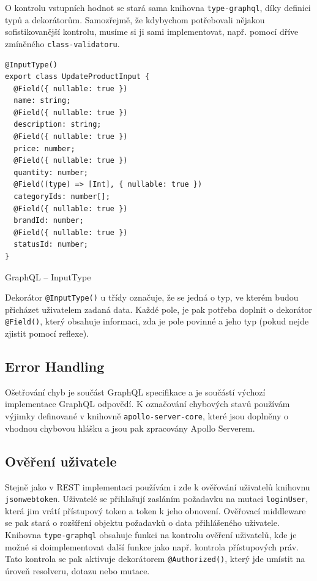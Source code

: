 \documentclass[thesis=M,czech]{FITthesis}[2019/12/23]
\begin{document}
O kontrolu vstupních hodnot se stará sama knihovna \texttt{type-graphql}, díky definici typů a dekorátorům. Samozřejmě, že kdybychom potřebovali nějakou sofistikovanější kontrolu, musíme si ji sami implementovat, např. pomocí dříve zmíněného \texttt{class-validatoru}. 

\begin{listing}[H]
\begin{verbatim}
@InputType()
export class UpdateProductInput {
  @Field({ nullable: true })
  name: string;
  @Field({ nullable: true })
  description: string;
  @Field({ nullable: true })
  price: number;
  @Field({ nullable: true })
  quantity: number;
  @Field((type) => [Int], { nullable: true })
  categoryIds: number[];
  @Field({ nullable: true })
  brandId: number;
  @Field({ nullable: true })
  statusId: number;
}
\end{verbatim}
\caption{GraphQL -- InputType}
\label{lst:graphql_inputtype}
\end{listing}

Dekorátor \texttt{@InputType()} u třídy označuje, že se jedná o typ, ve kterém budou přicházet uživatelem zadaná data. Každé pole, je pak potřeba doplnit o dekorátor \texttt{@Field()}, který obsahuje informaci, zda je pole povinné a jeho typ (pokud nejde zjistit pomocí reflexe).

\subsection{Error Handling}
Ošetřování chyb je součást GraphQL specifikace a je součástí výchozí implementace GraphQL odpovědí. K označování chybových stavů používám výjimky definované v knihovně \texttt{apollo-server-core}, které jsou doplněny o vhodnou chybovou hlášku a jsou pak zpracovány Apollo Serverem.

\subsection{Ověření uživatele}
Stejně jako v REST implementaci používám i zde k ověřování uživatelů knihovnu \texttt{jsonwebtoken}. Uživatelé se přihlašují zasláním požadavku na mutaci \texttt{loginUser}, která jim vrátí přístupový token a token k jeho obnovení. Ověřovací middleware se pak stará o rozšíření objektu požadavků o data přihlášeného uživatele. Knihovna \texttt{type-graphql} obsahuje funkci na kontrolu ověření uživatelů, kde je možné si doimplementovat další funkce jako např. kontrola přístupových práv. Tato kontrola se pak aktivuje dekorátorem \texttt{@Authorized()}, který jde umístit na úroveň resolveru, dotazu nebo mutace.
\end{document}
